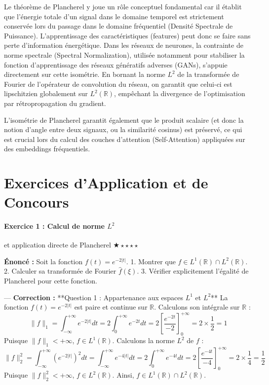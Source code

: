 \documentclass[11pt,a4paper]{article}
\begin{document}
Le théorème de Plancherel y joue un rôle conceptuel fondamental car il établit que l'énergie totale d'un signal dans le domaine temporel est strictement conservée lors du passage dans le domaine fréquentiel (Densité Spectrale de Puissance). L'apprentissage des caractéristiques (features) peut donc se faire sans perte d'information énergétique.
Dans les réseaux de neurones, la contrainte de norme spectrale (Spectral Normalization), utilisée notamment pour stabiliser la fonction d'apprentissage des réseaux génératifs adverses (GANs), s'appuie directement sur cette isométrie. En bornant la norme $L^2$ de la transformée de Fourier de l'opérateur de convolution du réseau, on garantit que celui-ci est lipschitzien globalement sur $L^2(\mathbb{R})$, empêchant la divergence de l'optimisation par rétropropagation du gradient.

L'isométrie de Plancherel garantit également que le produit scalaire (et donc la notion d'angle entre deux signaux, ou la similarité cosinus) est préservé, ce qui est crucial lors du calcul des couches d'attention (Self-Attention) appliquées sur des embeddings fréquentiels.


\newpage
\part{Exercices d'Application et de Concours}
\subsection{Exercice 1 : Calcul de norme $L^2$} et application directe de Plancherel
$\bigstar\star\star\star\star$

\textbf{Énoncé :}
Soit la fonction $f(t) = e^{-2|t|}$.
1. Montrer que $f \in L^1(\mathbb{R}) \cap L^2(\mathbb{R})$.
2. Calculer sa transformée de Fourier $\hat{f}(\xi)$.
3. Vérifier explicitement l'égalité de Plancherel pour cette fonction.

---
\textbf{Correction :}
**Question 1 : Appartenance aux espaces $L^1$ et $L^2$**
La fonction $f(t) = e^{-2|t|}$ est paire et continue sur $\mathbb{R}$.
Calculons son intégrale sur $\mathbb{R}$ :
$$ \|f\|_1 = \int_{-\infty}^{+\infty} e^{-2|t|} dt = 2 \int_{0}^{+\infty} e^{-2t} dt = 2 \left[ \frac{e^{-2t}}{-2} \right]_0^{+\infty} = 2 \times \frac{1}{2} = 1 $$
Puisque $\|f\|_1 < +\infty$, $f \in L^1(\mathbb{R})$.
Calculons la norme $L^2$ de $f$ :
$$ \|f\|_2^2 = \int_{-\infty}^{+\infty} \left(e^{-2|t|}\right)^2 dt = \int_{-\infty}^{+\infty} e^{-4|t|} dt = 2 \int_{0}^{+\infty} e^{-4t} dt = 2 \left[ \frac{e^{-4t}}{-4} \right]_0^{+\infty} = 2 \times \frac{1}{4} = \frac{1}{2} $$
Puisque $\|f\|_2^2 < +\infty$, $f \in L^2(\mathbb{R})$. Ainsi, $f \in L^1(\mathbb{R}) \cap L^2(\mathbb{R})$.
\end{document}
